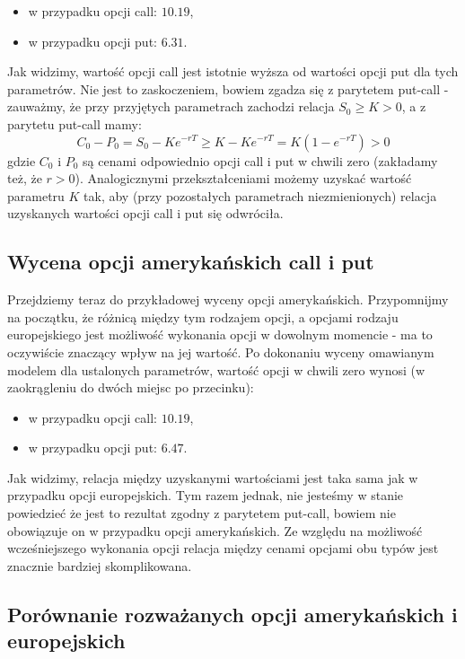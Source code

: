 \documentclass[
]{article}
\begin{document}
\begin{itemize}
\item
  w przypadku opcji call: \(10.19\),
\item
  w przypadku opcji put: \(6.31\).
\end{itemize}

Jak widzimy, wartość opcji call jest istotnie wyższa od wartości opcji
put dla tych parametrów. Nie jest to zaskoczeniem, bowiem zgadza się z
parytetem put-call - zauważmy, że przy przyjętych parametrach zachodzi
relacja \(S_0 \ge K > 0\), a z parytetu put-call mamy: \[
C_0 - P_0 = S_0 - Ke^{-rT} \ge K - Ke^{-rT} = K(1 - e^{-rT}) > 0
\] gdzie \(C_0\) i \(P_0\) są cenami odpowiednio opcji call i put w
chwili zero (zakładamy też, że \(r > 0\)). Analogicznymi
przekształceniami możemy uzyskać wartość parametru \(K\) tak, aby (przy
pozostałych parametrach niezmienionych) relacja uzyskanych wartości
opcji call i put się odwróciła.

\hypertarget{wycena-opcji-amerykaux144skich-call-i-put}{%
\subsection{Wycena opcji amerykańskich call i
put}\label{wycena-opcji-amerykaux144skich-call-i-put}}

Przejdziemy teraz do przykładowej wyceny opcji amerykańskich.
Przypomnijmy na początku, że różnicą między tym rodzajem opcji, a
opcjami rodzaju europejskiego jest możliwość wykonania opcji w dowolnym
momencie - ma to oczywiście znaczący wpływ na jej wartość. Po dokonaniu
wyceny omawianym modelem dla ustalonych parametrów, wartość opcji w
chwili zero wynosi (w zaokrągleniu do dwóch miejsc po przecinku):

\begin{itemize}
\item
  w przypadku opcji call: \(10.19\),
\item
  w przypadku opcji put: \(6.47\).
\end{itemize}

Jak widzimy, relacja między uzyskanymi wartościami jest taka sama jak w
przypadku opcji europejskich. Tym razem jednak, nie jesteśmy w stanie
powiedzieć że jest to rezultat zgodny z parytetem put-call, bowiem nie
obowiązuje on w przypadku opcji amerykańskich. Ze względu na możliwość
wcześniejszego wykonania opcji relacja między cenami opcjami obu typów
jest znacznie bardziej skomplikowana.

\hypertarget{poruxf3wnanie-rozwaux17canych-opcji-amerykaux144skich-i-europejskich}{%
\subsection{Porównanie rozważanych opcji amerykańskich i
europejskich}\label{poruxf3wnanie-rozwaux17canych-opcji-amerykaux144skich-i-europejskich}}
\end{document}
